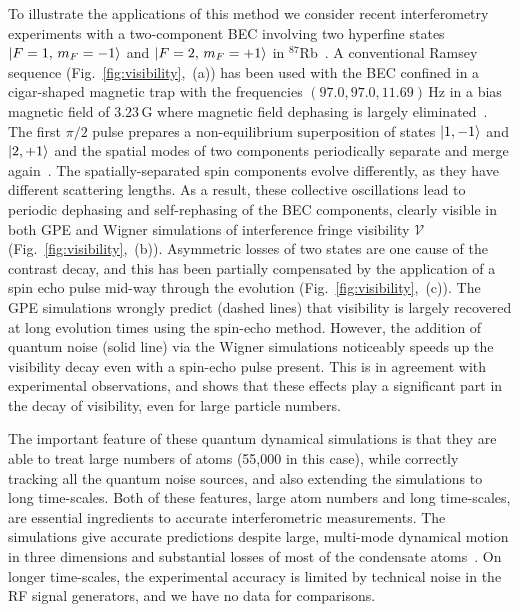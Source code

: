\documentclass[aps,prl,twocolumn,showpacs,amsmath,amssymb,superscriptaddress,flushbottom,noraggedfooter]{revtex4-1}
\newcommand{\Rb}{$^{87}$Rb}
\newcommand{\figref}[1]{Fig.~\ref{#1}}
\newcommand{\ket}[1]{\mbox{\ensuremath{\vert #1 \rangle}}}
\begin{document}
To illustrate the applications of this method we consider recent interferometry
experiments with a two-component BEC involving two hyperfine states
${\ket{F=1,\, m_F=-1}}$ and ${\ket{F=2,\, m_F=+1}}$ in \Rb~\cite{Egorov2011}.
A conventional Ramsey sequence (\figref{fig:visibility},~(a)) has been used
with the BEC confined in a cigar-shaped magnetic trap with the frequencies $(97.0, 97.0, 11.69)\,\mathrm{Hz}$
in a bias magnetic field of $3.23\,\mathrm{G}$ where magnetic field dephasing is largely eliminated~\cite{Hall1998}.
The first $\pi/2$ pulse prepares a non-equilibrium superposition of states ${\ket{1,-1}}$ and ${\ket{2,+1}}$
and the spatial modes of two components periodically separate and merge again~\cite{Mertes2007}.
The spatially-separated spin components evolve differently, as they have
different scattering lengths.
As a result, these collective oscillations lead to periodic dephasing and
self-rephasing of the BEC components, clearly visible in both GPE and Wigner
simulations of interference fringe visibility
$\mathcal{V}$ (\figref{fig:visibility},~(b)).
Asymmetric losses of two states are one cause of the contrast decay, and
this has been partially compensated by the application of a spin echo pulse
mid-way through the evolution (\figref{fig:visibility},~(c)).
The GPE simulations wrongly predict (dashed lines) that visibility is largely
recovered at long evolution times using the spin-echo method.
However, the addition of quantum noise (solid line) via the Wigner simulations
noticeably speeds up the visibility decay even with a spin-echo pulse present.
This is in agreement with experimental observations, and shows that these
effects play a significant part in the decay of visibility, even for
large particle numbers.

The important feature of these quantum dynamical simulations
is that they are able to treat large numbers of atoms (55,000 in this case),
while correctly tracking all the quantum noise sources, and also extending the simulations to long time-scales.
Both of these features, large atom numbers and long time-scales,
are essential ingredients to accurate interferometric measurements.
The simulations give accurate predictions despite large, multi-mode dynamical motion in three dimensions
and substantial losses of most of the condensate atoms~\cite{Egorov2011}.
On longer time-scales, the experimental accuracy is limited by technical noise in the RF signal generators,
and we have no data for comparisons.
\end{document}
